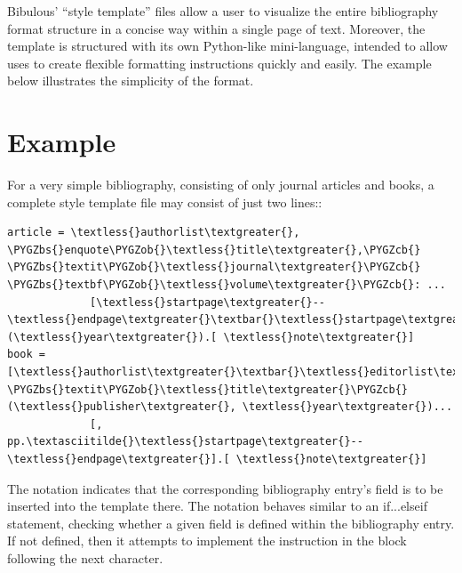 \documentclass[letterpaper,10pt,english]{sphinxmanual}
\def\PYGZbs{\char`\\}
\def\PYGZob{\char`\{}
\def\PYGZcb{\char`\}}
\begin{document}
Bibulous' “style template” files allow a user to visualize the entire bibliography format structure in a concise way within a single page of text. Moreover, the template is structured with its own Python-like mini-language, intended to allow uses to create flexible formatting instructions quickly and easily. The example below illustrates the simplicity of the format.


\section{Example}
\label{index:example}
For a very simple bibliography, consisting of only journal articles and books, a complete style template file may consist of just two lines::

\begin{Verbatim}[commandchars=\\\{\}]
article = \textless{}authorlist\textgreater{}, \PYGZbs{}enquote\PYGZob{}\textless{}title\textgreater{},\PYGZcb{} \PYGZbs{}textit\PYGZob{}\textless{}journal\textgreater{}\PYGZcb{} \PYGZbs{}textbf\PYGZob{}\textless{}volume\textgreater{}\PYGZcb{}: ...
             [\textless{}startpage\textgreater{}--\textless{}endpage\textgreater{}\textbar{}\textless{}startpage\textgreater{}\textbar{}\textless{}eid\textgreater{}\textbar{}] (\textless{}year\textgreater{}).[ \textless{}note\textgreater{}]
book = [\textless{}authorlist\textgreater{}\textbar{}\textless{}editorlist\textgreater{}\textbar{}], \PYGZbs{}textit\PYGZob{}\textless{}title\textgreater{}\PYGZcb{} (\textless{}publisher\textgreater{}, \textless{}year\textgreater{})...
             [, pp.\textasciitilde{}\textless{}startpage\textgreater{}--\textless{}endpage\textgreater{}].[ \textless{}note\textgreater{}]
\end{Verbatim}

The  notation indicates that the corresponding bibliography entry's field is to be inserted into the template there. The \code{{[}...\textbar{}...{]}} notation behaves similar to an if...elseif statement, checking whether a given field is defined within the bibliography entry. If not defined, then it attempts to implement the instruction in the block following the next \textbar{} character.
\end{document}
